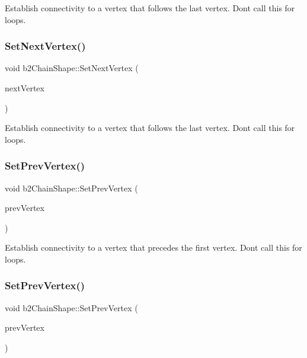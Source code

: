 Establish connectivity to a vertex that follows the last vertex. Don\textquotesingle{}t call this for loops. \mbox{\label{classb2ChainShape_a15c7c2821a52266ef57621ac7d34a95f}} 
\subsubsection{\texorpdfstring{Set\+Next\+Vertex()}{SetNextVertex()}\hspace{0.1cm}{\footnotesize\ttfamily [2/2]}}
{\footnotesize\ttfamily void b2\+Chain\+Shape\+::\+Set\+Next\+Vertex (\begin{DoxyParamCaption}\item[{const \hyperlink{structb2Vec2}{b2\+Vec2} \&}]{next\+Vertex }\end{DoxyParamCaption})}

Establish connectivity to a vertex that follows the last vertex. Don\textquotesingle{}t call this for loops. \mbox{\label{classb2ChainShape_aeb2ddbe0c52a98885e91b7c8f597315b}} 
\subsubsection{\texorpdfstring{Set\+Prev\+Vertex()}{SetPrevVertex()}\hspace{0.1cm}{\footnotesize\ttfamily [1/2]}}
{\footnotesize\ttfamily void b2\+Chain\+Shape\+::\+Set\+Prev\+Vertex (\begin{DoxyParamCaption}\item[{const \hyperlink{structb2Vec2}{b2\+Vec2} \&}]{prev\+Vertex }\end{DoxyParamCaption})}

Establish connectivity to a vertex that precedes the first vertex. Don\textquotesingle{}t call this for loops. \mbox{\label{classb2ChainShape_aeb2ddbe0c52a98885e91b7c8f597315b}} 
\subsubsection{\texorpdfstring{Set\+Prev\+Vertex()}{SetPrevVertex()}\hspace{0.1cm}{\footnotesize\ttfamily [2/2]}}
{\footnotesize\ttfamily void b2\+Chain\+Shape\+::\+Set\+Prev\+Vertex (\begin{DoxyParamCaption}\item[{const \hyperlink{structb2Vec2}{b2\+Vec2} \&}]{prev\+Vertex }\end{DoxyParamCaption})}

